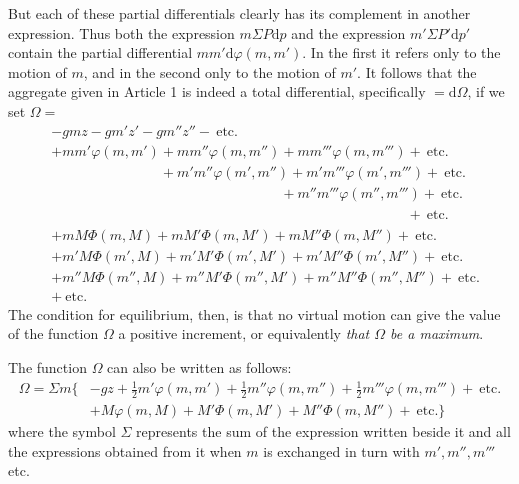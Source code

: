But each of these partial differentials clearly has its complement in another expression. Thus both the expression $m\Sigma P\mathrm{d}p$ and the expression $m'\Sigma P'\mathrm{d}p'$ contain the partial differential $mm'\mathrm{d}\varphi(m,m')$. In the first it refers only to the motion of $m$, and in the second only to the motion of $m'$. It follows that the aggregate given in Article 1 is indeed a total differential, specifically $=\mathrm{d}\Omega$, if we set $\Omega=$
\[
\begin{aligned}
&-gmz-gm'z'-gm''z''-\ \text{etc.}\\
&+mm'\varphi(m,m')+mm''\varphi(m,m'')+mm'''\varphi(m,m''')+\ \text{etc.}\\
&\phantom{+mm'\varphi(m,m')}+m'm''\varphi(m',m'')+m'm'''\varphi(m',m''')+\ \text{etc.}\\
&\phantom{+mm'\varphi(m,m')+mm''\varphi(m,m'')}+m''m'''\varphi(m'',m''')+\ \text{etc.}\\
&\phantom{+mm'\varphi(m,m')+mm''\varphi(m,m'')+mm'''\varphi(m,m''')}+\ \text{etc.}\\
&+mM\Phi(m,M)+mM'\Phi(m,M')+mM''\Phi(m,M'')+\ \text{etc.}\\
&+m'M\Phi(m',M)+m'M'\Phi(m',M')+m'M''\Phi(m',M'')+\ \text{etc.}\\
&+m''M\Phi(m'',M)+m''M'\Phi(m'',M')+m''M''\Phi(m'',M'')+\ \text{etc.}\\
&+\ \text{etc.}
\end{aligned}
\]
The condition for equilibrium, then, is that no virtual motion can give the value of the function $\Omega$ a positive increment, or equivalently \textit{that $\Omega$ be a maximum}.

The function $\Omega$ can also be written as follows:
\[
\begin{aligned}
\Omega=\Sigma m\{&-gz+\tfrac12m'\varphi(m,m')+\tfrac12m''\varphi(m,m'')+\tfrac12m'''\varphi(m,m''')+\ \text{etc.}\\
&+M\varphi(m,M)+M'\Phi(m,M')+M''\Phi(m,M'')+\ \text{etc.}\}
\end{aligned}
\]
where the symbol $\Sigma$ represents the sum of the expression written beside it and all the expressions obtained from it when $m$ is exchanged in turn with $m',m'',m'''$ etc.

